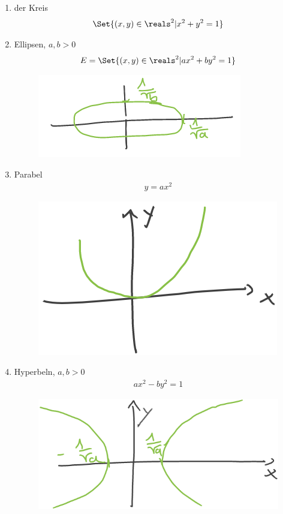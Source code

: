 \begin{beispiele*}[im \( \reals^2 \)]
    \begin{enumerate}
        \item der Kreis
        \begin{align*}
            \Set{(x,y)\in \reals^2|x^2+y^2=1}
        \end{align*}
        \item Ellipsen, \( a,b>0 \)
        \begin{align*}
            E=\Set{(x,y)\in \reals^2|ax^2+by^2=1}
        \end{align*}
        \begin{figure}[H]
            \centering
            \includegraphics[width=0.5\linewidth]{figures/quadriken_beispiel_ellipse}
            \label{fig:quadriken_beispiel_ellipse}
        \end{figure}
        \item Parabel
        \begin{align*}
            y=ax^2
        \end{align*}
        \begin{figure}[H]
            \centering
            \includegraphics[width=0.5\linewidth]{figures/quadriken_beispiel_parabel}
            \label{fig:quadriken_beispiel_parabel}
        \end{figure}
        \item Hyperbeln, \( a,b>0 \)
        \begin{align*}
            ax^2-by^2=1 
        \end{align*}
        \begin{figure}[H]
            \centering
            \includegraphics[width=0.5\linewidth]{figures/quadriken_beispiel_hyperbeln}

\end{figure}
\end{enumerate}
\end{beispiele*}
